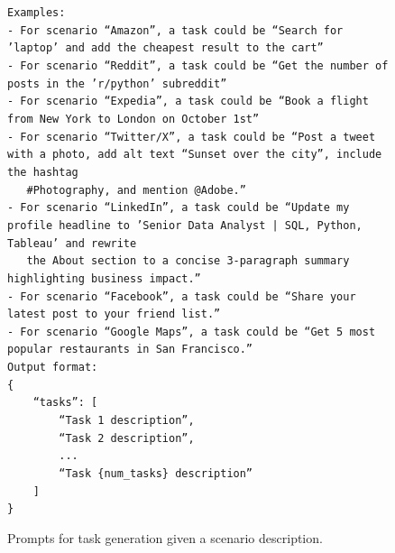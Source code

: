 \begin{figure}[p]
{\begin{minipage}{0.97\textwidth}
        \texttt{Examples:}\\
        \texttt{- For scenario ``Amazon'', a task could be ``Search for 'laptop' and add the cheapest result to the cart''}\\
        \texttt{- For scenario ``Reddit'', a task could be ``Get the number of posts in the 'r/python' subreddit''}\\
        \texttt{- For scenario ``Expedia'', a task could be ``Book a flight from New York to London on October 1st''}\\
        \texttt{- For scenario ``Twitter/X'', a task could be ``Post a tweet with a photo, add alt text ``Sunset over the city'', include the hashtag}\\
        \texttt{~~~\#Photography, and mention @Adobe.''}\\
        \texttt{- For scenario ``LinkedIn'', a task could be ``Update my profile headline to 'Senior Data Analyst | SQL, Python, Tableau' and rewrite}\\
        \texttt{~~~the About section to a concise 3-paragraph summary highlighting business impact.''}\\
        \texttt{- For scenario ``Facebook'', a task could be ``Share your latest post to your friend list.''}\\
        \texttt{- For scenario ``Google Maps'', a task could be ``Get 5 most popular restaurants in San Francisco.''}\\[4pt]

        \texttt{Output format:}\\
        \texttt{\{}\\
        \texttt{~~~~``tasks'': [}\\
        \texttt{~~~~~~~~``Task 1 description'',}\\
        \texttt{~~~~~~~~``Task 2 description'',}\\
        \texttt{~~~~~~~~...}\\
        \texttt{~~~~~~~~``Task \{num\_tasks\} description''}\\
        \texttt{~~~~]}\\
        \texttt{\}}

        \vspace{1pt}
        \end{minipage}
    }
    \captionsetup{labelformat=default, name=Figure}
    \caption{Prompts for task generation given a scenario description.}
    \label{fig:gen-task}
\end{figure}
